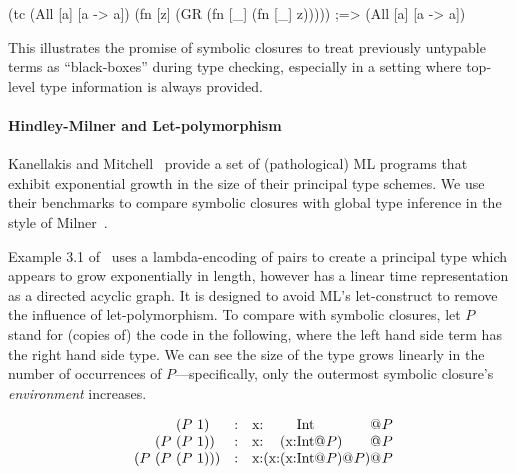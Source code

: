 \documentclass[11pt]{iuthesis}
\begin{document}
\begin{cljlisting}
(tc (All [a] [a -> a])
    (fn [z]
      (GR (fn [_] (fn [_] z)))))
;=> (All [a] [a -> a])
\end{cljlisting}

This illustrates the promise of symbolic closures to treat previously untypable terms
as ``black-boxes'' during type checking, especially in a setting where top-level
type information is always provided.

\paragraph{Hindley-Milner and Let-polymorphism}
%
Kanellakis and Mitchell~\cite{kanellakis1989polymorphic}
provide a set of (pathological) ML programs that exhibit exponential
growth in the size of their principal type schemes.
We use their benchmarks to compare symbolic closures with
global type inference in the style of Milner~\cite{milner1978theory}.

Example 3.1 of~\cite{kanellakis1989polymorphic} uses a lambda-encoding of pairs to create a principal type
which appears to grow exponentially in length, however has a linear time representation as a directed acyclic graph.
It is designed to avoid ML's let-construct to remove the influence of let-polymorphism.
To compare with symbolic closures,
let $P$ stand for (copies of) the code  in the following, where the left
hand side term has the right hand side type.
We can see the size of the type grows linearly in the number of occurrences of $P$---specifically,
only the outermost symbolic closure's \emph{environment} increases.

{
\[
\begin{array}{c@{}c@{}c@{}c@{}ccr@{}r@{}r@{}r@{}r@{}r@{}r@{}r@{}r}
  &&{(P\ 1)}&&        & : &    \ltiClosure{\hastype{\text{x}}{&&&\text{Int}&&}&}{P}\\
  &{(P\ } &{(P\ 1)}& {)}&    & : &   \ltiClosure{\hastype{\text{x}}
                                                 {&&(\ltiClosure{\hastype{\text{x}}{&\text{Int}&}}{{P}})&&}}
                                                {P}\\
{(P\ }&{(P\ }&{(P\ 1)}&{)}&{)}    & : &   \ltiClosure{\hastype{\text{x}}
                                                      {&(\ltiClosure{\hastype{\text{x}}{&(\ltiClosure{\hastype{\text{x}}{&\text{Int}&}}{{P}})&}}{{P}})}&}
                                                     {P}
\end{array}
\]
}
\end{document}
